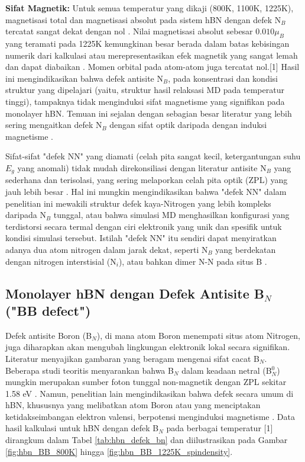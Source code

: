 \textbf{Sifat Magnetik:}
Untuk semua temperatur yang dikaji (800K, 1100K, 1225K), magnetisasi total dan magnetisasi absolut pada sistem hBN dengan defek N$_B$ tercatat sangat dekat dengan nol \cite{[1, 1]}. Nilai magnetisasi absolut sebesar $0.010 \mu_B$ yang teramati pada 1225K kemungkinan besar berada dalam batas kebisingan numerik dari kalkulasi atau merepresentasikan efek magnetik yang sangat lemah dan dapat diabaikan \cite{[1, 1]}. Momen orbital pada atom-atom juga tercatat nol.[1] Hasil ini mengindikasikan bahwa defek antisite N$_B$, pada konsentrasi dan kondisi struktur yang dipelajari (yaitu, struktur hasil relaksasi MD pada temperatur tinggi), tampaknya tidak menginduksi sifat magnetisme yang signifikan pada monolayer hBN. Temuan ini sejalan dengan sebagian besar literatur yang lebih sering mengaitkan defek N$_B$ dengan sifat optik daripada dengan induksi magnetisme \cite{[1, 4]}.

Sifat-sifat "defek NN" yang diamati (celah pita sangat kecil, ketergantungan suhu $E_g$ yang anomali) tidak mudah direkonsiliasi dengan literatur antisite N$_B$ yang sederhana dan terisolasi, yang sering melaporkan celah pita optik (ZPL) yang jauh lebih besar \cite{[1, 4]}. Hal ini mungkin mengindikasikan bahwa "defek NN" dalam penelitian ini mewakili struktur defek kaya-Nitrogen yang lebih kompleks daripada N$_B$ tunggal, atau bahwa simulasi MD menghasilkan konfigurasi yang terdistorsi secara termal dengan ciri elektronik yang unik dan spesifik untuk kondisi simulasi tersebut. Istilah "defek NN" itu sendiri dapat menyiratkan adanya dua atom nitrogen dalam jarak dekat, seperti N$_B$ yang berdekatan dengan nitrogen interstisial (N$_i$), atau bahkan dimer N-N pada situs B \cite{[1, 6]}.

\subsection{Monolayer hBN dengan Defek Antisite B$_N$ ("BB defect")}
\label{subsec:hbn_defek_bn}
Defek antisite Boron (B$_N$), di mana atom Boron menempati situs atom Nitrogen, juga diharapkan akan mengubah lingkungan elektronik lokal secara signifikan. Literatur menyajikan gambaran yang beragam mengenai sifat cacat B$_N$. Beberapa studi teoritis menyarankan bahwa B$_N$ dalam keadaan netral (B$_N^0$) mungkin merupakan sumber foton tunggal non-magnetik dengan ZPL sekitar 1.58 eV \cite{[1, 4, 5]}. Namun, penelitian lain mengindikasikan bahwa defek secara umum di hBN, khususnya yang melibatkan atom Boron atau yang menciptakan ketidakseimbangan elektron valensi, berpotensi menginduksi magnetisme \cite{[1], Si2010, Alam2012}. Data hasil kalkulasi untuk hBN dengan defek B$_N$ pada berbagai temperatur [1] dirangkum dalam Tabel \ref{tab:hbn_defek_bn} dan diilustrasikan pada Gambar \ref{fig:hbn_BB_800K} hingga \ref{fig:hbn_BB_1225K_spindensity}.

